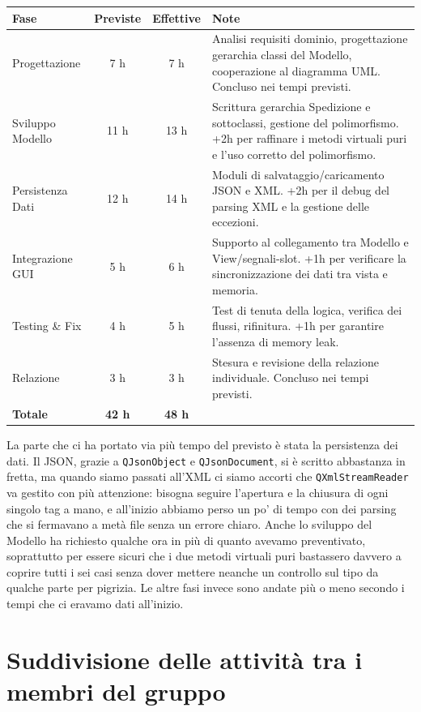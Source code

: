 \documentclass[10pt,a4paper]{article}
\begin{document}
\begin{center}
\begin{tabular}{|l|c|c|p{6cm}|}
\hline
\textbf{Fase} & \textbf{Previste} & \textbf{Effettive} & \textbf{Note} \\
\hline
Progettazione & 7 h & 7 h & Analisi requisiti dominio, progettazione gerarchia classi del Modello, cooperazione al diagramma UML. Concluso nei tempi previsti. \\
\hline
Sviluppo Modello & 11 h & 13 h & Scrittura gerarchia Spedizione e sottoclassi, gestione del polimorfismo. +2h per raffinare i metodi virtuali puri e l'uso corretto del polimorfismo. \\
\hline
Persistenza Dati & 12 h & 14 h & Moduli di salvataggio/caricamento JSON e XML. +2h per il debug del parsing XML e la gestione delle eccezioni. \\
\hline
Integrazione GUI & 5 h & 6 h & Supporto al collegamento tra Modello e View/segnali-slot. +1h per verificare la sincronizzazione dei dati tra vista e memoria. \\
\hline
Testing \& Fix & 4 h & 5 h & Test di tenuta della logica, verifica dei flussi, rifinitura. +1h per garantire l'assenza di memory leak. \\
\hline
Relazione & 3 h & 3 h & Stesura e revisione della relazione individuale. Concluso nei tempi previsti. \\
\hline
\textbf{Totale} & \textbf{42 h} & \textbf{48 h} & \\
\hline
\end{tabular}
\end{center}

La parte che ci ha portato via più tempo del previsto è stata la persistenza dei dati. Il JSON, grazie a \texttt{QJsonObject} e \texttt{QJsonDocument}, si è scritto abbastanza in fretta, ma quando siamo passati all'XML ci siamo accorti che \texttt{QXmlStreamReader} va gestito con più attenzione: bisogna seguire l'apertura e la chiusura di ogni singolo tag a mano, e all'inizio abbiamo perso un po' di tempo con dei parsing che si fermavano a metà file senza un errore chiaro. Anche lo sviluppo del Modello ha richiesto qualche ora in più di quanto avevamo preventivato, soprattutto per essere sicuri che i due metodi virtuali puri bastassero davvero a coprire tutti i sei casi senza dover mettere neanche un controllo sul tipo da qualche parte per pigrizia. Le altre fasi invece sono andate più o meno secondo i tempi che ci eravamo dati all'inizio.

\section{Suddivisione delle attività tra i membri del gruppo}
\end{document}
